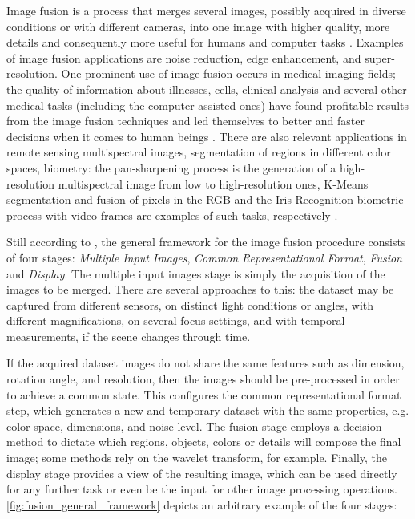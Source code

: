 Image fusion is a process that merges several images, possibly acquired in diverse conditions or with different cameras, into one image with higher quality, more details and consequently more useful for humans and computer tasks \cite{mitchell2010image}. Examples of image fusion applications are noise reduction, edge enhancement, and super-resolution. One prominent use of image fusion occurs in medical imaging fields; the quality of information about illnesses, cells, clinical analysis and several other medical tasks (including the computer-assisted ones) have found profitable results from the image fusion techniques and led themselves to better and faster decisions when it comes to human beings \cite{james2014medical}. There are also relevant applications in remote sensing multispectral images, segmentation of regions in different color spaces, biometry: the pan-sharpening process is the generation of a high-resolution multispectral image from low to high-resolution ones, K-Means segmentation and fusion of pixels in the RGB and the Iris Recognition biometric process with video frames are examples of such tasks, respectively \cite{mitchell2010image}.


Still according to , the general framework for the image fusion procedure consists of four stages: \emph{Multiple Input Images}, \emph{Common Representational Format}, \emph{Fusion} and \emph{Display}.
The multiple input images stage is simply the acquisition of the images to be merged. There are several approaches to this: the dataset may be captured from different sensors, on distinct light conditions or angles, with different magnifications, on several focus settings, and with temporal measurements, if the scene changes through time.

If the acquired dataset images do not share the same features such as dimension, rotation angle, and resolution, then the images should be pre-processed in order to achieve a common state. This configures the common representational format step, which generates a new and temporary dataset with the same properties, e.g. color space, dimensions, and noise level. The fusion stage employs a decision method to dictate which regions, objects, colors or details will compose the final image; some methods rely on the wavelet transform, for example. Finally, the display stage provides a view of the resulting image, which can be used directly for any further task or even be the input for other image processing operations. \autoref{fig:fusion_general_framework} depicts an arbitrary example of the four stages:

